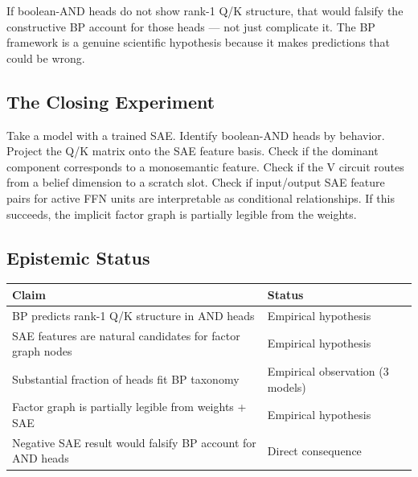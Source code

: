 If boolean-AND heads do not show rank-1 Q/K structure, that would falsify
the constructive BP account for those heads --- not just complicate it. The
BP framework is a genuine scientific hypothesis because it makes predictions
that could be wrong.

\subsection*{The Closing Experiment}

Take a model with a trained SAE. Identify boolean-AND heads by behavior.
Project the Q/K matrix onto the SAE feature basis. Check if the dominant
component corresponds to a monosemantic feature. Check if the V circuit
routes from a belief dimension to a scratch slot. Check if input/output SAE
feature pairs for active FFN units are interpretable as conditional
relationships. If this succeeds, the implicit factor graph is partially
legible from the weights.

\subsection*{Epistemic Status}

\begin{center}
\begin{tabular}{ll}
\toprule
Claim & Status \\
\midrule
BP predicts rank-1 Q/K structure in AND heads & Empirical hypothesis \\
SAE features are natural candidates for factor graph nodes & Empirical hypothesis \\
Substantial fraction of heads fit BP taxonomy & Empirical observation (3 models) \\
Factor graph is partially legible from weights + SAE & Empirical hypothesis \\
Negative SAE result would falsify BP account for AND heads & Direct consequence \\
\bottomrule
\end{tabular}
\end{center}